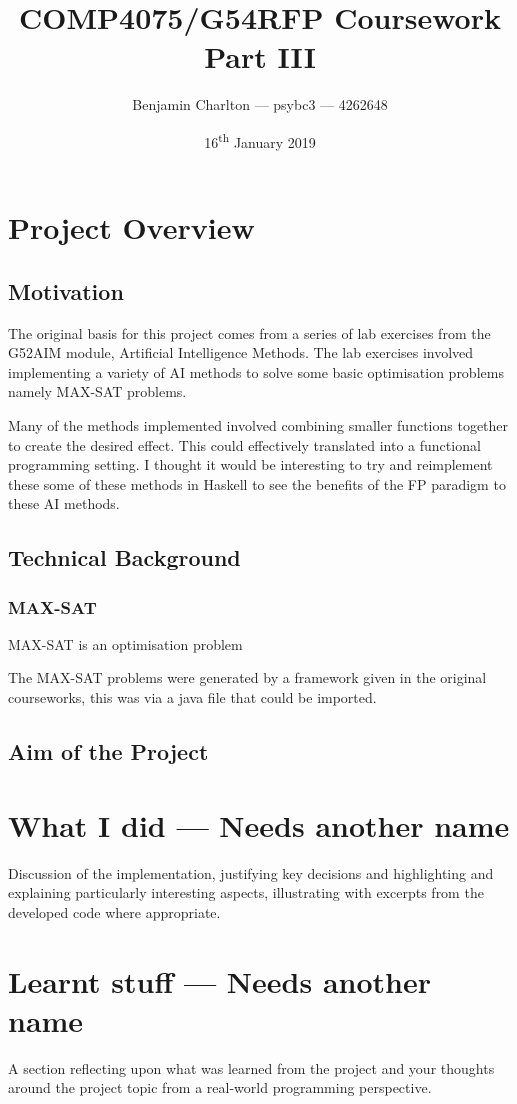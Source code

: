 \documentclass[a4paper]{article}
\title{COMP4075/G54RFP Coursework Part III}
\date{16\textsuperscript{th} January 2019}
\author{Benjamin Charlton --- psybc3 --- 4262648}
\begin{document}

\maketitle

\section{Project Overview}
\subsection{Motivation}
The original basis for this project comes from a series of lab exercises from the G52AIM module, Artificial Intelligence Methods.
The lab exercises involved implementing a variety of AI methods to solve some basic optimisation problems namely MAX-SAT problems.
\par
Many of the methods implemented involved combining smaller functions together to create the desired effect.
This could effectively translated into a functional programming setting.
I thought it would be interesting to try and reimplement these some of these methods in Haskell to see the benefits of the FP paradigm to these AI methods.

\subsection{Technical Background}
\subsubsection{MAX-SAT}
MAX-SAT is an optimisation problem

The MAX-SAT problems were generated by a framework given in the original courseworks, this was via a java file that could be imported.

\subsection{Aim of the Project}

\section{What I did --- Needs another name}
Discussion of the implementation, justifying key decisions and highlighting
and explaining particularly interesting aspects, illustrating with
excerpts from the developed code where appropriate.

\section{Learnt stuff --- Needs another name}
A section reflecting upon what was learned from the project and your
thoughts around the project topic from a real-world programming perspective.
\end{document}
